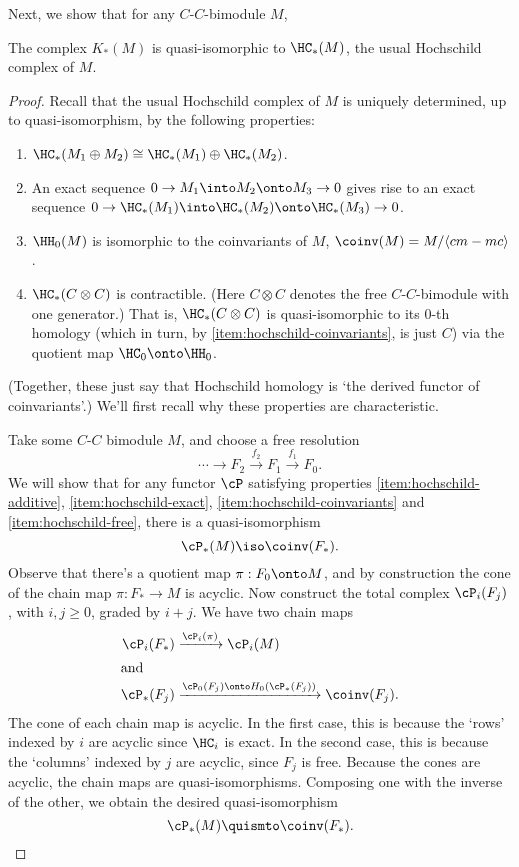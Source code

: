Next, we show that for any $C$-$C$-bimodule $M$,
\begin{prop} \label{prop:hoch}
The complex $K_*(M)$ is quasi-isomorphic to $\HC_*(M)$, the usual
Hochschild complex of $M$.
\end{prop}
\begin{proof}
Recall that the usual Hochschild complex of $M$ is uniquely determined,
up to quasi-isomorphism, by the following properties:
\begin{enumerate}
\item \label{item:hochschild-additive}%
$\HC_*(M_1 \oplus M_2) \cong \HC_*(M_1) \oplus \HC_*(M_2)$.
\item \label{item:hochschild-exact}%
An exact sequence $0 \to M_1 \into M_2 \onto M_3 \to 0$ gives rise to an
exact sequence $0 \to \HC_*(M_1) \into \HC_*(M_2) \onto \HC_*(M_3) \to 0$.
\item \label{item:hochschild-coinvariants}%
$\HH_0(M)$ is isomorphic to the coinvariants of $M$, $\coinv(M) =
M/\langle cm-mc \rangle$.
\item \label{item:hochschild-free}%
$\HC_*(C\otimes C)$ is contractible.
(Here $C\otimes C$ denotes
the free $C$-$C$-bimodule with one generator.)
That is, $\HC_*(C\otimes C)$ is
quasi-isomorphic to its $0$-th homology (which in turn, by \ref{item:hochschild-coinvariants}, is just $C$) via the quotient map $\HC_0 \onto \HH_0$.
\end{enumerate}
(Together, these just say that Hochschild homology is `the derived functor of coinvariants'.)
We'll first recall why these properties are characteristic.

Take some $C$-$C$ bimodule $M$, and choose a free resolution
\begin{equation*}
\cdots \to F_2 \xrightarrow{f_2} F_1 \xrightarrow{f_1} F_0.
\end{equation*}
We will show that for any functor $\cP$ satisfying properties
\ref{item:hochschild-additive}, \ref{item:hochschild-exact},
\ref{item:hochschild-coinvariants} and \ref{item:hochschild-free}, there
is a quasi-isomorphism
$$\cP_*(M) \iso \coinv(F_*).$$
%
Observe that there's a quotient map $\pi: F_0 \onto M$, and by
construction the cone of the chain map $\pi: F_* \to M$ is acyclic. Now
construct the total complex $\cP_i(F_j)$, with $i,j \geq 0$, graded by
$i+j$. We have two chain maps
\begin{align*}
\cP_i(F_*) & \xrightarrow{\cP_i(\pi)} \cP_i(M) \\
\intertext{and}
\cP_*(F_j) & \xrightarrow{\cP_0(F_j) \onto H_0(\cP_*(F_j))} \coinv(F_j).
\end{align*}
The cone of each chain map is acyclic. In the first case, this is because the `rows' indexed by $i$ are acyclic since $\HC_i$ is exact.
In the second case, this is because the `columns' indexed by $j$ are acyclic, since $F_j$ is free.
Because the cones are acyclic, the chain maps are quasi-isomorphisms. Composing one with the inverse of the other, we obtain the desired quasi-isomorphism
$$\cP_*(M) \quismto \coinv(F_*).$$


\end{proof}

